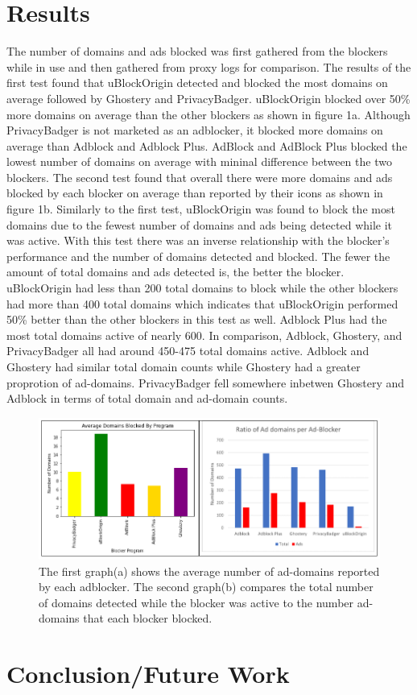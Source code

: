 \documentclass[sigsmall]{acmart}
\begin{document}
\section*{Results}
The number of domains and ads blocked was first gathered from the blockers while in use and then gathered from proxy logs for comparison. The results of the first test found that uBlockOrigin detected and blocked the most domains on average followed by Ghostery and PrivacyBadger. uBlockOrigin blocked over 50\% more domains on average than the other blockers as shown in figure 1a. Although PrivacyBadger is not marketed as an adblocker, it blocked more domains on average than Adblock and Adblock Plus. 
AdBlock and AdBlock Plus blocked the lowest number of domains on average with mininal difference between the two blockers.   
The second test found that overall there were more domains and ads blocked by each blocker on average than reported by their icons as shown in figure 1b. Similarly to the first test, uBlockOrigin was found to block the most domains due to the fewest number of domains and ads being detected while it was active. With this test there was an inverse relationship with the blocker's performance and the number of domains detected and blocked. The fewer the amount of total domains and ads detected is, the better the blocker. uBlockOrigin had less than 200 total domains to block while the other blockers had more than 400 total domains which indicates that uBlockOrigin performed 50\% better than the other blockers in this test as well. Adblock Plus had the most total domains active of nearly 600. In comparison, Adblock, Ghostery, and PrivacyBadger all had around 450-475 total domains active. Adblock and Ghostery had similar total domain counts while Ghostery had a greater proprotion of ad-domains. PrivacyBadger fell somewhere inbetwen Ghostery and Adblock in terms of total domain and ad-domain counts.   
\begin{figure}[h]
  \includegraphics[scale = 0.75]{Edit3.png}
  \caption{ The first graph(a) shows the average number of ad-domains reported by each adblocker. The second graph(b) compares the total number of domains detected while the blocker was active to the number ad-domains that each blocker blocked.}
  \label{fig:graph1ab}
\end{figure}

\section*{Conclusion/Future Work}




\end{document}
